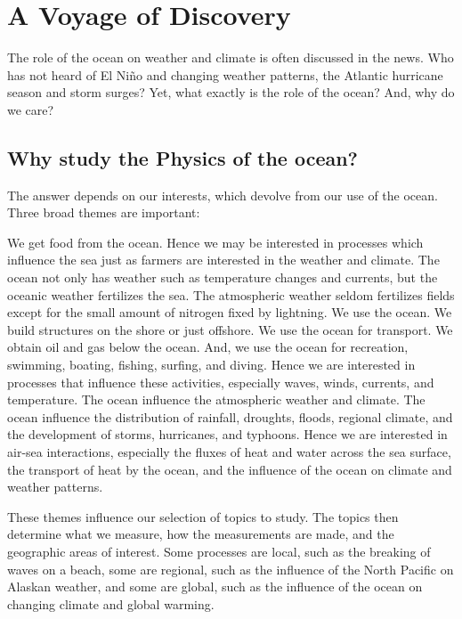 \chapter{A Voyage of Discovery}

The role of the ocean on weather and climate is often
discussed in the news. Who has not heard of El Ni\~{n}o and changing
weather patterns, the Atlantic hurricane season and storm surges? Yet,
what exactly is the role of the ocean? And, why do we care?

\section[Physics of the ocean]{Why study the Physics of the ocean?}

The answer depends on our interests, which devolve from our use of the
ocean. Three broad themes are important:
\begin{enumerate}
\vitem We get food from the ocean. Hence we may be interested in
processes which influence the sea just as farmers are interested in
the weather and climate. The ocean not only has weather such as
temperature changes and currents, but the oceanic weather fertilizes
the sea. The atmospheric weather seldom fertilizes fields except for
the small amount of nitrogen fixed by lightning.
\vspace{-0.5ex}
\vitem We use the ocean. We build structures on the shore or just
offshore. We use the ocean for transport. We obtain oil and gas below
the ocean. And, we use the ocean for recreation, swimming, boating,
fishing, surfing, and diving. Hence we are interested in processes
that influence these activities, especially waves, winds, currents,
and temperature.
\vspace{-0.5ex}
\vitem The ocean influence the atmospheric weather and climate. The
ocean influence the distribution of rainfall, droughts, floods,
regional climate, and the development of storms, hurricanes, and
typhoons. Hence we are interested in air-sea interactions, especially
the fluxes of heat and water across the sea surface, the transport of
heat by the ocean, and the influence of the ocean on climate and
weather patterns.
\end{enumerate}
These themes influence our selection of topics to study. The topics
then determine what we measure, how the measurements are made, and the
geographic areas of interest. Some processes are local, such as the
breaking of waves on a beach, some are regional, such as the influence
of the North Pacific on Alaskan weather, and some are global, such as
the influence of the ocean on changing climate and global warming.

